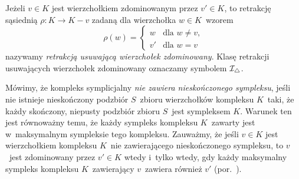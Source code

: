 Jeżeli $v\in K$ jest wierzchołkiem zdominowanym przez $v'\in K$, to retrakcję sąsiednią $\rho\colon K\to K-v$ zadaną dla wierzchołka $w\in K$~wzorem \[\rho(w)=\begin{cases}w & \text{dla } w\not=v,\\ v' & \text{dla } w=v\end{cases}\] nazywamy \textit{retrakcją usuwającą wierzchołek zdominowany}. Klasę retrakcji usuwających wierzchołek zdominowany oznaczamy symbolem $\mathcal{I}_\triangle$.

Mówimy, że kompleks symplicjalny \textit{nie zawiera nieskończonego sympleksu}, jeśli nie istnieje nieskończony podzbiór $S$~zbioru wierzchołków kompleksu $K$~taki, że każdy skończony, niepusty podzbiór zbioru $S$~jest sympleksem $K$. Warunek ten jest równoważny temu, że każdy sympleks kompleksu $K$~zawarty jest w~maksymalnym sympleksie tego kompleksu. Zauważmy, że jeśli $v\in K$ jest wierzchołkiem kompleksu $K$~nie zawierającego nieskończonego sympleksu, to $v$~jest zdominowany przez $v'\in K$ wtedy i~tylko wtedy, gdy każdy maksymalny sympleks kompleksu $K$~zawierający $v$~zawiera również $v'$ (por.~\cite[Remark 2.2]{Barmak12}). 

